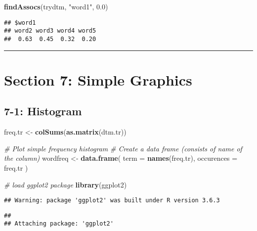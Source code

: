 \documentclass[
]{article}
\newenvironment{Shaded}{\begin{snugshade}}{\end{snugshade}}
\newcommand{\CommentTok}[1]{\textcolor[rgb]{0.56,0.35,0.01}{\textit{#1}}}
\newcommand{\DataTypeTok}[1]{\textcolor[rgb]{0.13,0.29,0.53}{#1}}
\newcommand{\FloatTok}[1]{\textcolor[rgb]{0.00,0.00,0.81}{#1}}
\newcommand{\KeywordTok}[1]{\textcolor[rgb]{0.13,0.29,0.53}{\textbf{#1}}}
\newcommand{\NormalTok}[1]{#1}
\newcommand{\StringTok}[1]{\textcolor[rgb]{0.31,0.60,0.02}{#1}}
\begin{document}
\begin{Shaded}
\begin{Highlighting}[]
\KeywordTok{findAssocs}\NormalTok{(trydtm, }\StringTok{"word1"}\NormalTok{, }\FloatTok{0.0}\NormalTok{)}
\end{Highlighting}
\end{Shaded}

\begin{verbatim}
## $word1
## word2 word3 word4 word5 
##  0.63  0.45  0.32  0.20
\end{verbatim}

\begin{center}\rule{0.5\linewidth}{0.5pt}\end{center}

\hypertarget{section-7-simple-graphics}{%
\section{Section 7: Simple Graphics}\label{section-7-simple-graphics}}

\hypertarget{histogram}{%
\subsection{7-1: Histogram}\label{histogram}}

\begin{Shaded}
\begin{Highlighting}[]
\NormalTok{freq.tr <-}\StringTok{ }\KeywordTok{colSums}\NormalTok{(}\KeywordTok{as.matrix}\NormalTok{(dtm.tr))}

\CommentTok{# Plot simple frequency histogram}
\CommentTok{# Create a data frame (consists of name of the column)}
\NormalTok{wordfreq <-}\StringTok{ }\KeywordTok{data.frame}\NormalTok{(}
  \DataTypeTok{term =} \KeywordTok{names}\NormalTok{(freq.tr), }\DataTypeTok{occurences =}\NormalTok{ freq.tr}
\NormalTok{)}

\CommentTok{# load ggplot2 package}
\KeywordTok{library}\NormalTok{(ggplot2)}
\end{Highlighting}
\end{Shaded}

\begin{verbatim}
## Warning: package 'ggplot2' was built under R version 3.6.3
\end{verbatim}

\begin{verbatim}
## 
## Attaching package: 'ggplot2'
\end{verbatim}
\end{document}
